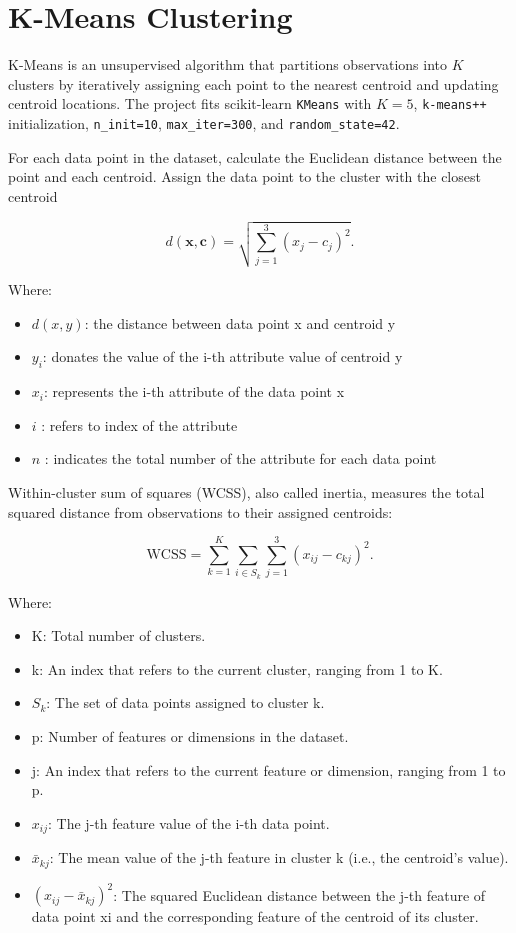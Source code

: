 \section{K-Means Clustering}

K-Means is an unsupervised algorithm that partitions observations into \(K\) clusters by iteratively assigning each
point to the nearest centroid and updating centroid locations. The project fits scikit-learn \texttt{KMeans} with
\(K=5\), \texttt{k-means++} initialization, \texttt{n\_init=10}, \texttt{max\_iter=300}, and \texttt{random\_state=42}.

For each data point in the dataset, calculate the Euclidean distance between the point and each centroid. Assign the
data point to the cluster with the closest centroid

\[ d(\mathbf{x},\mathbf{c}) = \sqrt{\sum_{j=1}^{3} (x_j-c_j)^2}. \]

Where:
\begin{itemize}
  \item $d(x, y)$: the distance between data point x and centroid y
  \item $y_i$: donates the value of the i-th attribute value of centroid y
  \item $x_i$: represents the i-th attribute of the data point x
  \item $i$ : refers to index of the attribute
  \item $n$ : indicates the total number of the attribute for each data point
\end{itemize}

Within-cluster sum of squares (WCSS), also called inertia, measures the total squared distance from observations to
their assigned centroids:

\[ \mathrm{WCSS}=\sum_{k=1}^{K}\sum_{i\in S_k}\sum_{j=1}^{3}(x_{ij}-c_{kj})^2. \]

Where:
\begin{itemize}
  \item K: Total number of clusters.
  \item k: An index that refers to the current cluster, ranging from 1 to K.
  \item $S_k$: The set of data points assigned to cluster k.
  \item p: Number of features or dimensions in the dataset.
  \item j: An index that refers to the current feature or dimension, ranging from 1 to p.
  \item $x_{ij}$: The j-th feature value of the i-th data point.
  \item $\bar{x}_{kj}$: The mean value of the j-th feature in cluster k (i.e., the centroid's value).
  \item $(x_{ij} - \bar{x}_{kj})^2$: The squared Euclidean distance between the j-th feature of data point xi and the corresponding feature of the centroid of its cluster.
\end{itemize}

